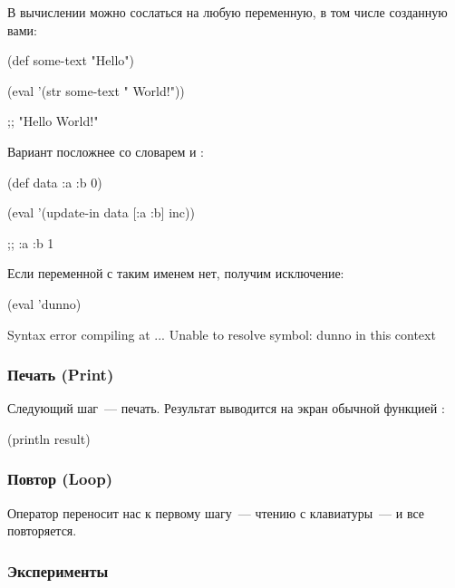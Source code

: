 В вычислении можно сослаться на любую переменную, в том числе созданную вами:

\begin{english}
  \begin{clojure}
(def some-text "Hello")

(eval '(str some-text " World!"))

;; "Hello World!"
  \end{clojure}
\end{english}

Вариант посложнее со словарем и :

\begin{english}
  \begin{clojure}
(def data {:a {:b 0}})

(eval '(update-in data [:a :b] inc))

;; {:a {:b 1}}
  \end{clojure}
\end{english}

Если переменной с таким именем нет, получим исключение:

\begin{english}
  \begin{clojure}
(eval 'dunno)

Syntax error compiling at ...
Unable to resolve symbol: dunno in this context
  \end{clojure}
\end{english}

\subsubsection{Печать (Print)}

Следующий шаг~--- печать. Результат  выводится на экран обычной функцией :

\begin{english}
  \begin{clojure}
(println result)
  \end{clojure}
\end{english}

\subsubsection{Повтор (Loop)}

Оператор  переносит нас к первому шагу~--- чтению с клавиатуры~--- и все повторяется.

\subsubsection{Эксперименты}

